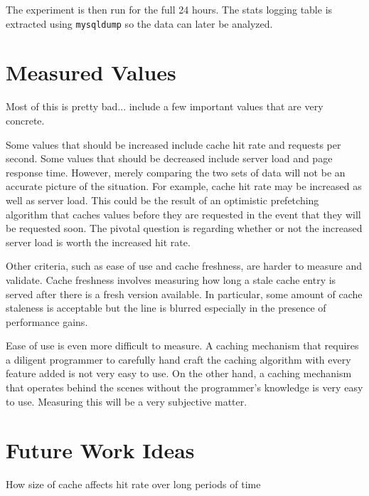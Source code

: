 \documentclass[12pt]{ucthesis}
\begin{document}
The experiment is then run for the full 24 hours.
The stats logging table is extracted using {\tt mysqldump} so the data can later be analyzed.

\section{Measured Values}
Most of this is pretty bad... include a few important values that are very concrete.

Some values that should be increased include cache hit rate and requests per second.
Some values that should be decreased include server load and page response time.
However, merely comparing the two sets of data will not be an accurate picture of the situation.
For example, cache hit rate may be increased as well as server load.
This could be the result of an optimistic prefetching algorithm that caches values before they are requested in the event that they will be requested soon.
The pivotal question is regarding whether or not the increased server load is worth the increased hit rate.

Other criteria, such as ease of use and cache freshness, are harder to measure and validate.
Cache freshness involves measuring how long a stale cache entry is served after there is a fresh version available.
In particular, some amount of cache staleness is acceptable but the line is blurred especially in the presence of performance gains.

Ease of use is even more difficult to measure.
A caching mechanism that requires a diligent programmer to carefully hand craft the caching algorithm with every feature added is not very easy to use.
On the other hand, a caching mechanism that operates behind the scenes without the programmer's knowledge is very easy to use.
Measuring this will be a very subjective matter.


\section{Future Work Ideas}
\label{futureWork}
How size of cache affects hit rate over long periods of time



\clearpage


\end{document}

